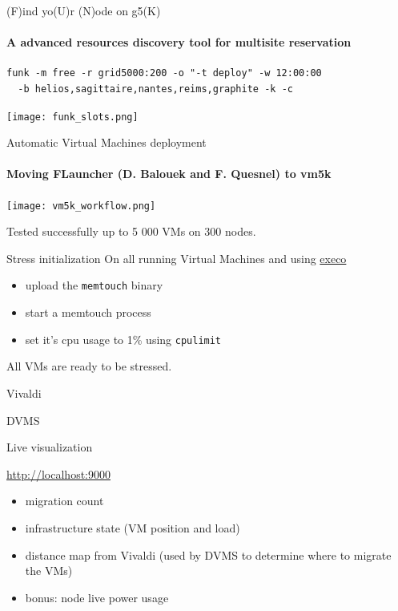 \documentclass{beamer}
\begin{document}
\begin{frame}[fragile]{(F)ind yo(U)r (N)ode on g5(K)}
\framesubtitle{A advanced resources discovery tool for multisite reservation}
\small
\begin{verbatim}
funk -m free -r grid5000:200 -o "-t deploy" -w 12:00:00 
  -b helios,sagittaire,nantes,reims,graphite -k -c
\end{verbatim}
\begin{center}
\texttt{[image: funk\_slots.png]}
\end{center}
\end{frame}

 
\begin{frame}{Automatic Virtual Machines deployment}
\framesubtitle{Moving FLauncher (D. Balouek and F. Quesnel) to vm5k}
\begin{center}
\texttt{[image: vm5k\_workflow.png]}
\end{center}
\begin{alertblock}{}
Tested successfully up to 5 000 VMs on 300 nodes.
\end{alertblock}
\end{frame}

\begin{frame}[fragile]{Stress initialization}
On all running Virtual Machines and using \href{http://execo.gforge.inria.fr/doc/latest-stable/userguide.html}{execo}
\begin{itemize}
    \item upload the \verb=memtouch= binary
    \item start a memtouch process
    \item set it's cpu usage to 1\% using \verb=cpulimit=
\end{itemize}
\begin{alertblock}{}
All VMs are ready to be stressed.
\end{alertblock}

\end{frame}

\begin{frame}{Vivaldi}

\end{frame}

\begin{frame}{DVMS}

\end{frame}

\begin{frame}{Live visualization}
\begin{center}
    \url{http://localhost:9000}
\end{center}
\begin{itemize}
    \item migration count
    \item infrastructure state (VM position and load) 
    \item distance map from Vivaldi (used by DVMS to determine where to migrate the VMs)
    \item bonus: node live power usage
\end{itemize}
\end{frame}
    
\end{document}
